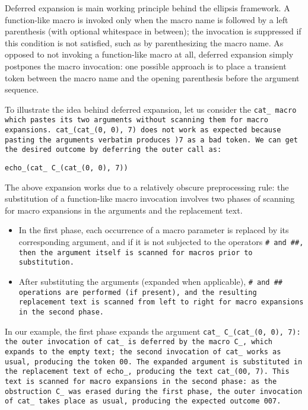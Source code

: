 \def\Subsection#1{\subsection{#1}}

Deferred expansion is main working principle behind the ellipsis framework.
A function-like macro is invoked only when the macro name is followed by a left
parenthesis (with optional whitespace in between); the invocation is suppressed
if this condition is not satisfied, such as by parenthesizing the macro name.
As opposed to not invoking a function-like macro at all,
deferred expansion simply postpones the macro invocation:
one possible approach is to place a transient token between the
macro name and the opening parenthesis before the argument sequence.

To illustrate the idea behind deferred expansion, let us consider the \tt{cat_}
macro which pastes its two arguments without scanning them for macro expansions.
\tt{cat_(cat_(0, 0), 7)} does not work as expected because
pasting the arguments verbatim produces \tt{)7} as a bad token.
We can get the desired outcome by deferring the outer call as:

\begin{center}
\tt{echo_(cat_ C_(cat_(0, 0), 7))}
\end{center}

The above expansion works due to a relatively obscure preprocessing rule:
the substitution of a function-like macro invocation involves two phases
of scanning for macro expansions in the arguments and the replacement text.

\begin{itemize}[nosep]

\item In the first phase, each occurrence of a macro parameter is replaced by its
corresponding argument, and if it is not subjected to the operators \tt{#} and
\tt{##}, then the argument itself is scanned for macros prior to substitution.

\item After substituting the arguments (expanded when applicable), \tt{#} and
\tt{##} operations are performed (if present), and the resulting replacement
text is scanned from left to right for macro expansions in the second phase.

\end{itemize}

In our example, the first phase expands the argument
\tt{cat_ C_(cat_(0, 0), 7)}: the outer invocation of \tt{cat_} is
deferred by the macro \tt{C_}, which expands to the empty text;
the second invocation of \tt{cat_} works as usual, producing the token \tt{00}.
The expanded argument is substituted in the replacement
text of \tt{echo_}, producing the text \tt{cat_(00, 7)}.
This text is scanned for macro expansions in the second phase: as the
obstruction \tt{C_} was erased during the first phase, the outer invocation
of \tt{cat_} takes place as usual, producing the expected outcome \tt{007}.

